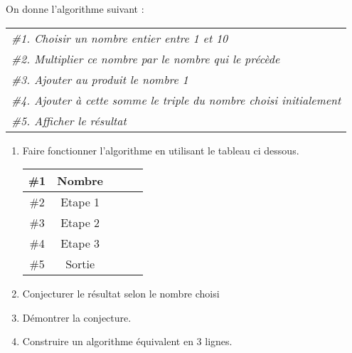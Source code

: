 
On donne l'algorithme suivant :


\begin{tabular}{|p{7.5cm}|}
\hline 
\textit{\#1. Choisir un nombre entier entre 1 et 10}\\
\textit{\#2. Multiplier ce nombre par le nombre qui le précède}\\
\textit{\#3. Ajouter au produit le nombre 1}\\
\textit{\#4. Ajouter à cette somme le triple du nombre choisi initialement}\\
\textit{\#5. Afficher le résultat}\\
\hline 
\end{tabular} 


\begin{enumerate}
\item Faire fonctionner l'algorithme en utilisant le tableau ci dessous.

\begin{tabular}{|c|c|p{1cm}|p{1cm}|p{1cm}|}
\hline 
\#1 & Nombre &  &  &  \\ 
\hline 
\#2 & Etape 1 &  &  &  \\ 
\hline 
\#3 & Etape 2 &  &  &  \\ 
\hline 
\#4 & Etape 3 & &  &  \\ 
\hline 
\#5 & Sortie & &  &  \\ 
\hline 
\end{tabular} 

\item Conjecturer le résultat selon le nombre choisi
\item Démontrer la conjecture.
\item Construire un algorithme équivalent en 3 lignes.
\end{enumerate}